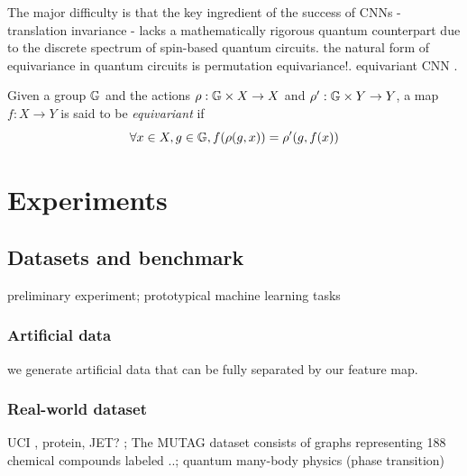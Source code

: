 The major difficulty is that the key ingredient of the success of CNNs - translation invariance - lacks a mathematically rigorous quantum counterpart due to the discrete spectrum of spin-based quantum circuits.
the natural form of equivariance in quantum circuits is permutation equivariance!.
equivariant CNN 
\cite{zhengSpeedingLearningQuantum2022}.
\begin{definition}[Equivariance]\label{def:equivariant}
	Given a group $\mathbb{G}$ and the actions $\rho: \mathbb{G} \times X\to X$ and $\rho': \mathbb{G} \times Y\to Y$,
	a map $f: X\to Y$ is said to be \emph{equivariant} if
	\begin{equation}
		\forall x\in X, g\in \mathbb{G},
		f(\rho(g,x)) = \rho'(g,f(x))
	\end{equation}
\end{definition}

\section{Experiments}\label{sec:experiments}

\subsection{Datasets and benchmark}
preliminary experiment;
prototypical machine learning tasks

\subsubsection{Artificial data}
we generate artificial data that can be fully separated by our feature map.

\subsubsection{Real-world dataset}
UCI \cite{kondorDiffusionKernelsGraphs2002}, protein, JET? \cite{bogatskiyLorentzGroupEquivariant2020}; 
The MUTAG dataset consists of graphs representing 188 chemical compounds labeled ..;
quantum many-body physics (phase transition)
\cite{carrasquillaMachineLearningPhases2017} 
\cite{congQuantumConvolutionalNeural2019}

